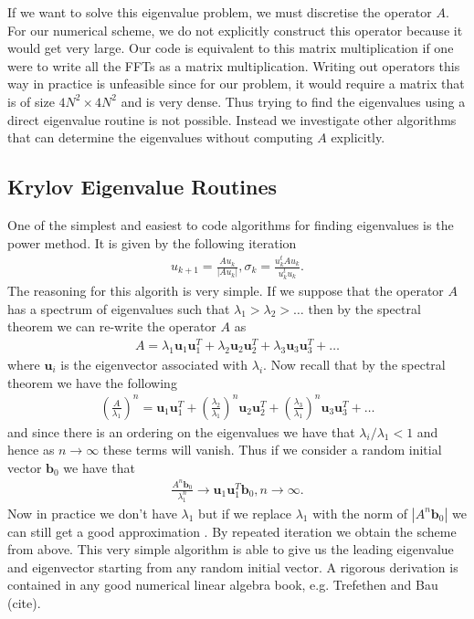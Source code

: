 If we want to solve this eigenvalue problem, we must discretise the operator $A$. For our numerical scheme, we do not explicitly construct this operator because it would get very large. Our code is equivalent to this matrix multiplication if one were to write all the FFTs as a matrix multiplication. Writing out operators this way in practice is unfeasible since for our problem, it would require a matrix that is of size $4N^{2}\times 4N^{2}$ and is very dense. Thus trying to find the eigenvalues using a direct eigenvalue routine is not possible. Instead we investigate other algorithms that can determine the eigenvalues without computing $A$ explicitly. 

\subsection{Krylov Eigenvalue Routines}
One of the simplest and easiest to code algorithms for finding eigenvalues is the power method. It is given by the following iteration \cite{MeyerLinAlg}
\begin{align}
u_{k+1}=\frac{Au_{k}}{|Au_{k}|}, \sigma_{k}=\frac{u_{k}^{t}Au_{k}}{u_{k}^{t}u_{k}}.
\end{align}
The reasoning for this algorith is very simple. If we suppose that the operator $A$ has a spectrum of eigenvalues such that $\lambda_{1} > \lambda_{2} > \ldots $ then by the spectral theorem we can re-write the operator $A$ as
\begin{align}
A = \lambda_{1}\bm{u}_{1}\bm{u}_{1}^{T} + \lambda_{2}\bm{u}_{2}\bm{u}_{2}^{T} + \lambda_{3}\bm{u}_{3}\bm{u}_{3}^{T} + \ldots 
\end{align} 
where $\bm{u}_{i}$ is the eigenvector associated with $\lambda_{i}$. Now recall that by the spectral theorem we have the following \cite{MeyerLinAlg}
\begin{align}
\left(\frac{A}{\lambda_{1}}\right)^{n} = \bm{u}_{1}\bm{u}_{1}^{T} + \left(\frac{\lambda_{2}}{\lambda_{1}}\right)^{n}\bm{u}_{2}\bm{u}_{2}^{T} + \left(\frac{\lambda_{3}}{\lambda_{1}}\right)^{n}\bm{u}_{3}\bm{u}_{3}^{T} + \ldots 
\end{align}
and since there is an ordering on the eigenvalues we have that $\lambda_{i}/\lambda_{1}<1$ and hence as $n\rightarrow\infty$ these terms will vanish. Thus if we consider a random initial vector $\bm{b}_{0}$ we have that 
\begin{align}
\frac{A^{n}\bm{b}_{0}}{\lambda_{1}^{n}}\rightarrow \bm{u}_{1}\bm{u}_{1}^{T}\bm{b}_{0}, n\rightarrow\infty.
\end{align}
Now in practice we don't have $\lambda_{1}$ but if we replace $\lambda_{1}$ with the norm of $|A^{n}\bm{b}_{0}|$ we can still get a good approximation \cite{MeyerLinAlg}. By repeated iteration we obtain the scheme from above. This very simple algorithm is able to give us the leading eigenvalue and eigenvector starting from any random initial vector. A rigorous derivation is contained in any good numerical linear algebra book, e.g. Trefethen and Bau (cite). 

